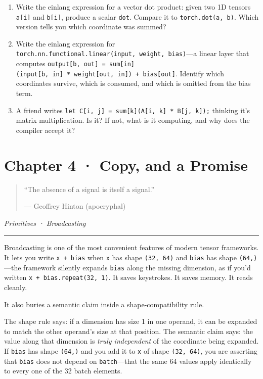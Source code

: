 \documentclass[11pt,]{article}
\begin{document}
\begin{enumerate}
\def\labelenumi{\arabic{enumi}.}
\item
  Write the einlang expression for a vector dot product: given two 1D
  tensors \texttt{a{[}i{]}} and \texttt{b{[}i{]}}, produce a scalar
  \texttt{dot}. Compare it to \texttt{torch.dot(a,\ b)}. Which version
  tells you which coordinate was summed?
\item
  Write the einlang expression for
  \texttt{torch.nn.functional.linear(input,\ weight,\ bias)}---a linear
  layer that computes
  \texttt{output{[}b,\ out{]}\ =\ sum{[}in{]}(input{[}b,\ in{]}\ *\ weight{[}out,\ in{]})\ +\ bias{[}out{]}}.
  Identify which coordinates survive, which is consumed, and which is
  omitted from the bias term.
\item
  A friend writes
  \texttt{let\ C{[}i,\ j{]}\ =\ sum{[}k{]}(A{[}i,\ k{]}\ *\ B{[}j,\ k{]});}
  thinking it's matrix multiplication. Is it? If not, what is it
  computing, and why does the compiler accept it?
\end{enumerate}

\newpage

\hypertarget{chapter-4-copy-and-a-promise}{%
\section{Chapter 4 · Copy, and a
Promise}\label{chapter-4-copy-and-a-promise}}

\begin{quote}
``The absence of a signal is itself a signal.''

--- Geoffrey Hinton (apocryphal)
\end{quote}

\emph{Primitives · Broadcasting}

\begin{center}\rule{0.5\linewidth}{0.4pt}\end{center}

Broadcasting is one of the most convenient features of modern tensor
frameworks. It lets you write \texttt{x\ +\ bias} when \texttt{x} has
shape \texttt{(32,\ 64)} and \texttt{bias} has shape
\texttt{(64,)}---the framework silently expands \texttt{bias} along the
missing dimension, as if you'd written
\texttt{x\ +\ bias.repeat(32,\ 1)}. It saves keystrokes. It saves
memory. It reads cleanly.

It also buries a semantic claim inside a shape-compatibility rule.

The shape rule says: if a dimension has size 1 in one operand, it can be
expanded to match the other operand's size at that position. The
semantic claim says: the value along that dimension is \emph{truly
independent} of the coordinate being expanded. If \texttt{bias} has
shape \texttt{(64,)} and you add it to \texttt{x} of shape
\texttt{(32,\ 64)}, you are asserting that \texttt{bias} does not depend
on \texttt{batch}---that the same 64 values apply identically to every
one of the 32 batch elements.
\end{document}
